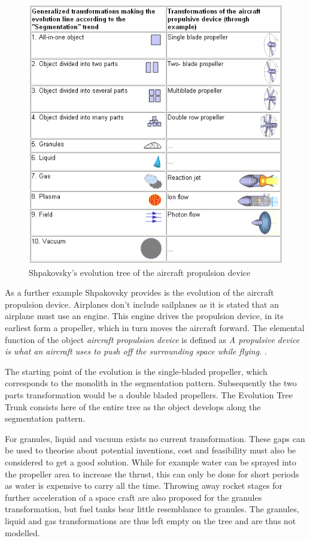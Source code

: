 \documentclass[11pt,a4paper]{article}
\begin{document}
\begin{figure}[htb]
  \centering
  \includegraphics[width=0.75\linewidth]{figures/aircraft.png}
  \caption{\small Shpakovsky's evolution tree of the aircraft propulsion
    device \cite{Shpakovsky2003}}
	\label{fig:aircraft}
\end{figure}

As a further example Shpakovsky provides is the evolution of the aircraft
propulsion device. Airplanes don't include sailplanes as it is stated that an
airplane must use an engine. This engine drives the propulsion device, in its
earliest form a propeller, which in turn moves the aircraft forward. The
elemental function of the object \textit{aircraft propulsion device} is
defined as \textit{A propulsive device is what an aircraft uses to push off
  the surrounding space while flying.} \cite{Shpakovsky2003}.

The starting point of the evolution is the single-bladed propeller, which
corresponds to the monolith in the segmentation pattern. Subsequently the two
parts transformation would be a double bladed propellers. The Evolution Tree
Trunk consists here of the entire tree as the object develops along the
segmentation pattern.

For granules, liquid and vacuum exists no current transformation. These gaps
can be used to theorise about potential inventions, cost and feasibility must
also be considered to get a good solution. While for example water can be
sprayed into the propeller area to increase the thrust, this can only be done
for short periods as water is expensive to carry all the time. Throwing away
rocket stages for further acceleration of a space craft are also proposed for
the granules transformation, but fuel tanks bear little resemblance to
granules. The granules, liquid and gas transformations are thus left empty on
the tree and are thus not modelled. 
\end{document}
